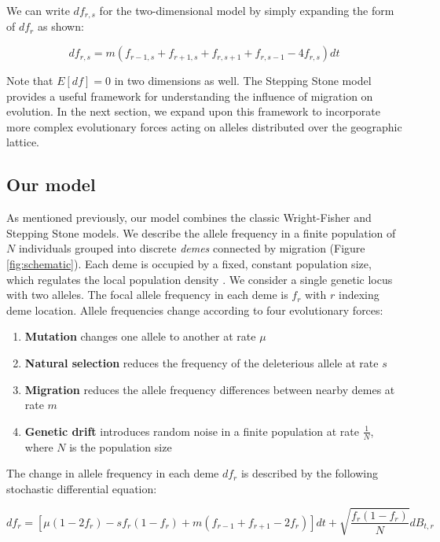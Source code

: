 We can write $df_{r,s}$ for the two-dimensional model by simply expanding the form of $df_r$ as shown:


\begin{equation}
    df_{r,s} = m(f_{r-1,s} + f_{r+1,s} + f_{r,s+1} + f_{r,s-1} - 4f_{r,s})dt
\end{equation}


Note that $E[df] = 0$ in two dimensions as well. The Stepping Stone model provides a useful framework for understanding the influence of migration on evolution. In the next section, we expand upon this framework to incorporate more complex evolutionary forces acting on alleles distributed over the geographic lattice.  


\subsection{Our model} \label{"section:our_model"}

As mentioned previously, our model combines the classic Wright-Fisher and Stepping Stone models. We describe the allele frequency in a finite population of $N$ individuals grouped into discrete \textit{demes} connected by migration (Figure \ref{fig:schematic}). Each deme is occupied by a fixed, constant population size, which regulates the local population density \cite{felsenstein_1975}. We consider a single genetic locus with two alleles. The focal allele frequency in each deme is $f_r$ with $r$ indexing deme location. Allele frequencies change according to four evolutionary forces:


\begin{enumerate}
    \item \textbf{Mutation} changes one allele to another at rate $\mu$
    \item \textbf{Natural selection} reduces the frequency of the deleterious allele at rate $s$
    \item \textbf{Migration} reduces the allele frequency differences between nearby demes at rate $m$
    \item \textbf{Genetic drift} introduces random noise in a finite population at rate $\frac{1}{N}$, \\ where $N$ is the population size
\end{enumerate}


The change in allele frequency in each deme $df_r$ is described by the following stochastic differential equation:

\begin{equation}
    \label{eq:model}
    df_r=[\mu(1-2f_r)-sf_r (1-f_r ) + m (f_{r-1}+f_{r+1}-2f_r)]dt+\sqrt{\frac{f_r (1-f_r )}{N}} dB_{t,r}
\end{equation}


